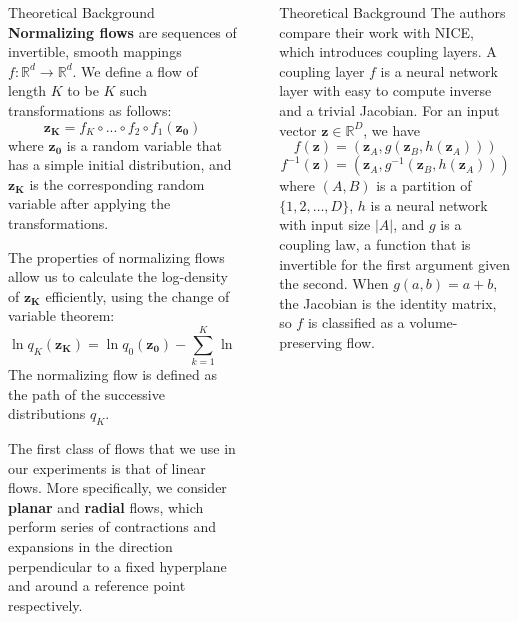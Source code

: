 \documentclass[final,hyperref={pdfpagelabels=false}]{beamer}
\newcommand{\shrink}{-15pt}
\begin{document}
\begin{frame}[t]
\begin{columns}[t]
\begin{column}{.3\textwidth}
    \begin{block}{Theoretical Background}
    \textbf{Normalizing flows} are sequences of invertible, smooth mappings $f:\mathbb{R}^d\rightarrow \mathbb{R}^d$. We define a flow of length $K$ to be $K$ such transformations as follows:
    \[ \mathbf{z_K} = f_K \circ ... \circ f_2 \circ f_1 (\mathbf{z_0}) \] 
    where $\mathbf{z_0}$ is a random variable that has a simple initial distribution, and $\mathbf{z_K}$ is the corresponding random variable after applying the transformations.
    
    The properties of normalizing flows allow us to calculate the log-density of $\mathbf{z_K}$ efficiently, using the change of variable theorem:
    \[ \ln q_K(\mathbf{z_K}) = \ln q_0(\mathbf{z_0}) - \sum_{k=1}^{K} \ln \left| \det \frac{\partial f_k}{\partial \mathbf{z_{k-1}}} \right| \]
    The normalizing flow is defined as the path of the successive distributions $q_K$.
    
    The first class of flows that we use in our experiments is that of linear flows. More specifically, we consider \textbf{planar} and \textbf{radial} flows, which perform series of contractions and expansions in the direction perpendicular to a fixed hyperplane and around a reference point respectively.
          
    \end{block}
  \end{column} %


  \begin{column}{.02\textwidth}\end{column} %

  \begin{column}{.3\textwidth} %
    \vspace{\shrink}
    \begin{block}{Theoretical Background}
      The authors compare their work with NICE, which introduces coupling layers. A coupling layer $f$ is a neural network layer with easy to compute inverse and a trivial Jacobian. For an input vector $\mathbf{z} \in \mathbb{R}^D$, we have
\begin{equation}
f(\mathbf{z}) = (\mathbf{z}_A, g(\mathbf{z}_B,h(\mathbf{z}_A))) 
\end{equation}
\begin{equation}
f^{-1}(\mathbf{z}) = (\mathbf{z}_A, g^{-1}(\mathbf{z}_B,h(\mathbf{z}_A)))
\end{equation}
where $(A,B)$ is a partition of $\{1,2,\dots,D\}$, $h$ is a neural network with input size $|A|$, and $g$ is a coupling law, a function that is invertible for the first argument given the second. When $g(a,b)=a+b$, the Jacobian is the identity matrix, so $f$ is classified as a volume-preserving flow.
\end{block}


\end{column}
\end{columns}
\end{frame}
\end{document}
